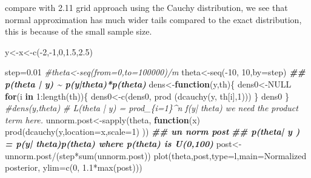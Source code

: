 \documentclass[
]{book}
\newenvironment{Shaded}{\begin{snugshade}}{\end{snugshade}}
\newcommand{\AttributeTok}[1]{\textcolor[rgb]{0.77,0.63,0.00}{#1}}
\newcommand{\CommentTok}[1]{\textcolor[rgb]{0.56,0.35,0.01}{\textit{#1}}}
\newcommand{\ConstantTok}[1]{\textcolor[rgb]{0.00,0.00,0.00}{#1}}
\newcommand{\ControlFlowTok}[1]{\textcolor[rgb]{0.13,0.29,0.53}{\textbf{#1}}}
\newcommand{\DecValTok}[1]{\textcolor[rgb]{0.00,0.00,0.81}{#1}}
\newcommand{\DocumentationTok}[1]{\textcolor[rgb]{0.56,0.35,0.01}{\textbf{\textit{#1}}}}
\newcommand{\FloatTok}[1]{\textcolor[rgb]{0.00,0.00,0.81}{#1}}
\newcommand{\FunctionTok}[1]{\textcolor[rgb]{0.00,0.00,0.00}{#1}}
\newcommand{\NormalTok}[1]{#1}
\newcommand{\OtherTok}[1]{\textcolor[rgb]{0.56,0.35,0.01}{#1}}
\newcommand{\SpecialCharTok}[1]{\textcolor[rgb]{0.00,0.00,0.00}{#1}}
\newcommand{\StringTok}[1]{\textcolor[rgb]{0.31,0.60,0.02}{#1}}
\theoremstyle{definition}
\theoremstyle{definition}
\theoremstyle{definition}
\theoremstyle{definition}
\theoremstyle{remark}
\begin{document}
compare with 2.11 grid approach using the Cauchy distribution, we see that normal approximation has much wider tails compared to the exact distribution, this is because of the small sample size.

\begin{Shaded}
\begin{Highlighting}[]
\NormalTok{  y}\OtherTok{\textless{}{-}}\NormalTok{x}\OtherTok{\textless{}{-}}\FunctionTok{c}\NormalTok{(}\SpecialCharTok{{-}}\DecValTok{2}\NormalTok{,}\SpecialCharTok{{-}}\DecValTok{1}\NormalTok{,}\DecValTok{0}\NormalTok{,}\FloatTok{1.5}\NormalTok{,}\FloatTok{2.5}\NormalTok{)}

\NormalTok{  step}\OtherTok{=}\FloatTok{0.01}
\CommentTok{\#theta\textless{}{-}seq(from=0,to=100000)/m}
\NormalTok{ theta}\OtherTok{\textless{}{-}}\FunctionTok{seq}\NormalTok{(}\SpecialCharTok{{-}}\DecValTok{10}\NormalTok{, }\DecValTok{10}\NormalTok{,}\AttributeTok{by=}\NormalTok{step)}
 \DocumentationTok{\#\# p(theta | y) \textasciitilde{} p(y|theta)*p(theta)}
\NormalTok{ dens}\OtherTok{\textless{}{-}}\ControlFlowTok{function}\NormalTok{(y,th)\{}
\NormalTok{   dens0}\OtherTok{\textless{}{-}}\ConstantTok{NULL}
   \ControlFlowTok{for}\NormalTok{(i }\ControlFlowTok{in} \DecValTok{1}\SpecialCharTok{:}\FunctionTok{length}\NormalTok{(th))\{}
\NormalTok{     dens0}\OtherTok{\textless{}{-}}\FunctionTok{c}\NormalTok{(dens0, }\FunctionTok{prod}\NormalTok{ (}\FunctionTok{dcauchy}\NormalTok{(y, th[i],}\DecValTok{1}\NormalTok{)))}
\NormalTok{   \}}
\NormalTok{   dens0}
\NormalTok{ \}}
 \CommentTok{\#dens(y,theta)}
  \CommentTok{\# L(theta | y) = prod\_\{i=1\}\^{}n  f(y| theta)  we need the product term here.}
\NormalTok{ unnorm.post}\OtherTok{\textless{}{-}}\FunctionTok{sapply}\NormalTok{(theta, }\ControlFlowTok{function}\NormalTok{(x)  }\FunctionTok{prod}\NormalTok{(}\FunctionTok{dcauchy}\NormalTok{(y,}\AttributeTok{location=}\NormalTok{x,}\AttributeTok{scale=}\DecValTok{1}\NormalTok{) )) }\DocumentationTok{\#\# un norm post}
   \DocumentationTok{\#\# p(theta| y ) = p(y| theta)p(theta)  where p(theta) is U(0,100)}
\NormalTok{ post}\OtherTok{\textless{}{-}}\NormalTok{unnorm.post}\SpecialCharTok{/}\NormalTok{(step}\SpecialCharTok{*}\FunctionTok{sum}\NormalTok{(unnorm.post))}
 \FunctionTok{plot}\NormalTok{(theta,post,}\AttributeTok{type=}\StringTok{\textquotesingle{}l\textquotesingle{}}\NormalTok{,}\AttributeTok{main=}\StringTok{\textquotesingle{}Normalized posterior\textquotesingle{}}\NormalTok{, }\AttributeTok{ylim=}\FunctionTok{c}\NormalTok{(}\DecValTok{0}\NormalTok{, }\FloatTok{1.1}\SpecialCharTok{*}\FunctionTok{max}\NormalTok{(post)))}
\end{Highlighting}
\end{Shaded}
\end{document}
